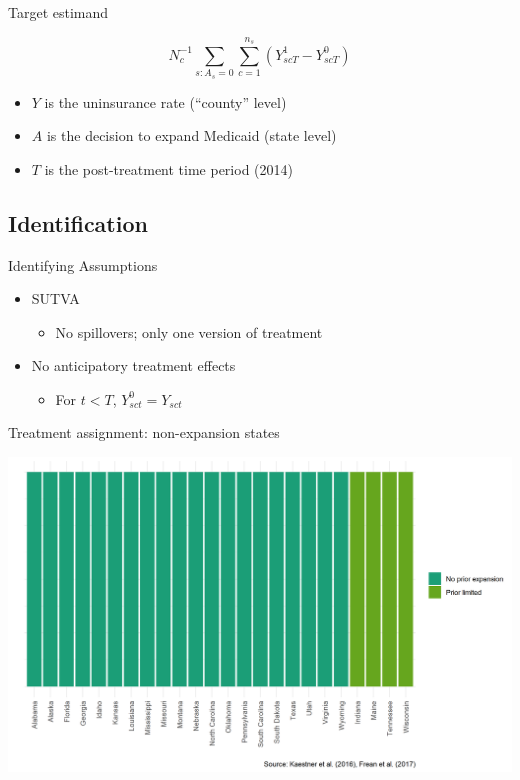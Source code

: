 \documentclass[hyperref={pdfpagelabels=false}]{beamer}
\begin{document}
\begin{frame}{Target estimand}

$$
N_c^{-1}\sum_{s: A_s = 0} \sum_{c = 1}^{n_s} (Y_{scT}^1 - Y_{scT}^0)
$$

\begin{itemize}
    \item $Y$ is the uninsurance rate (``county'' level) \bigskip
    \item $A$ is the decision to expand Medicaid (state level) \bigskip
    \item $T$ is the post-treatment time period (2014)
\end{itemize}
\end{frame}

\subsection{Identification}

\begin{frame}{Identifying Assumptions}

\begin{itemize}
    \item SUTVA \bigskip
    \begin{itemize}
        \item No spillovers; only one version of treatment \bigskip
    \end{itemize}
    \item No anticipatory treatment effects \bigskip
    \begin{itemize}
        \item For $t < T$, $Y_{sct}^0 = Y_{sct}$ \bigskip
    \end{itemize}
\end{itemize}

\end{frame}

\begin{frame}{Treatment assignment: non-expansion states}
    \begin{center}
	\includegraphics[scale=0.5]{01_Plots/expansion-heterogeneity-ctonly.png}
    \end{center}
\end{frame}
\end{document}
